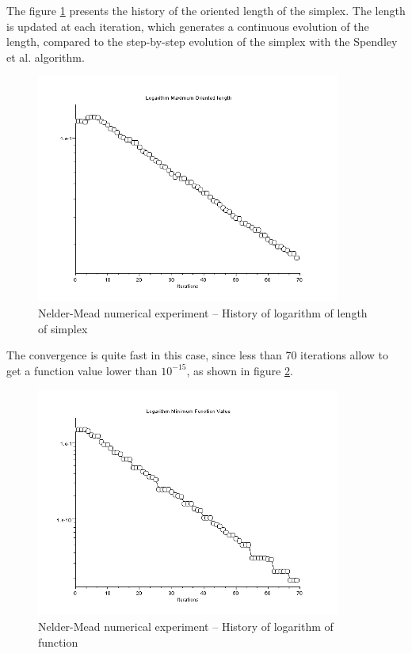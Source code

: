 The figure \ref{fig-nm-numexp1-sigma} presents the history of the oriented
length of the simplex. The length is updated at each iteration, which 
generates a continuous evolution of the length, compared to the 
step-by-step evolution of the simplex with the Spendley et al. algorithm.

\begin{figure}
\begin{center}
\includegraphics[width=10cm]{neldermeadmethod/quad2bis-nm-history-sigma.png}
\end{center}
\caption{Nelder-Mead numerical experiment -- History of logarithm of length of simplex}
\label{fig-nm-numexp1-sigma}
\end{figure}

The convergence is quite fast in this case, since less than 70 iterations
allow to get a function value lower than $10^{-15}$, as shown in 
figure \ref{fig-nm-numexp1-logfopt}.

\begin{figure}
\begin{center}
\includegraphics[width=10cm]{neldermeadmethod/quad2bis-nm-history-logfopt.png}
\end{center}
\caption{Nelder-Mead numerical experiment -- History of logarithm of function}
\label{fig-nm-numexp1-logfopt}
\end{figure}

